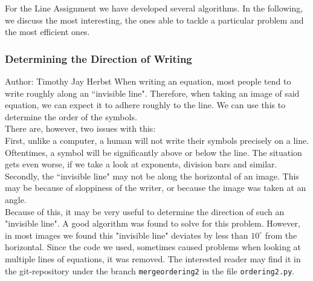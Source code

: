\documentclass[11pt]{article}
\begin{document}
	For the Line Assignment we have developed several algorithms. In the following, we discuss the most interesting, the ones able to tackle a particular problem and the most efficient ones.
	
	\subsubsection{Determining the Direction of Writing}
	\small{Author: Timothy Jay Herbst} \newline \newline
	When writing an equation, most people tend to write roughly along an ``invisible line".
	Therefore, when taking an image of said equation, we can expect it to adhere roughly to the line.
	We can use this to determine the order of the symbols.\\
	There are, however, two issues with this:\\
	First, unlike a computer, a human will not write their symbols precisely on a line.
	Oftentimes, a symbol will be significantly above or below the line.
	The situation gets even worse, if we take a look at exponents, division bars and similar.\\
	Secondly, the ``invisible line" may not be along the horizontal of an image.
	This may be because of sloppiness of the writer, or because the image was taken at an angle.\\
	Because of this, it may be very useful to determine the direction of such an "invisible line".
	A good algorithm was found to solve for this problem.
	However, in most images we found this "invisible line" deviates by less than $10^\circ$ from the horizontal.
	Since the code we used, sometimes caused problems when looking at multiple lines of equations, it was removed.
	The interested reader may find it in the git-repository under the branch \texttt{mergeordering2} in the file \texttt{ordering2.py}.
	
	
	
	
	
\end{document}
